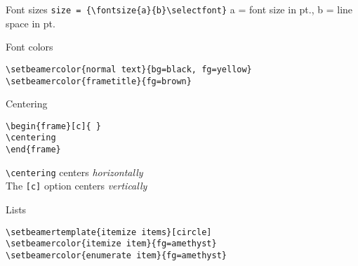 \documentclass[9pt]{beamer}
\begin{document}
\begin{frame}[fragile=singleslide]{Font sizes}
    \verb|size = {\fontsize{a}{b}\selectfont}|
    a = font size in pt., b = line space in pt.
\end{frame}%
\begin{frame}[fragile=singleslide]{Font colors}
\begin{verbatim}
\setbeamercolor{normal text}{bg=black, fg=yellow}
\setbeamercolor{frametitle}{fg=brown}
\end{verbatim}
\end{frame}%
\begin{frame}[fragile=singleslide]{Centering}
    \begin{verbatim}
\begin{frame}[c]{ }
\centering
\end{frame}
    \end{verbatim}

\verb|\centering| centers \emph{horizontally}\\
The \verb|[c]| option centers \emph{vertically}
\end{frame}%

\begin{frame}[fragile=singleslide]{Lists}
\begin{verbatim}
\setbeamertemplate{itemize items}[circle]
\setbeamercolor{itemize item}{fg=amethyst}
\setbeamercolor{enumerate item}{fg=amethyst}
\end{verbatim}
\end{frame}%
\end{document}

